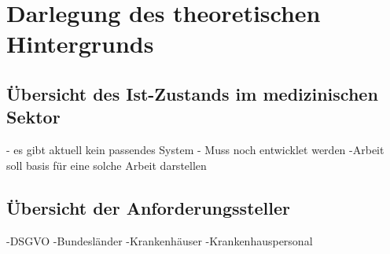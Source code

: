 \chapter{Darlegung des theoretischen Hintergrunds}\label{chapter:hintergrund}

\section{Übersicht des Ist-Zustands im medizinischen Sektor}\label{section:ueda}
- es gibt aktuell kein passendes System 
- Muss noch entwicklet werden
-Arbeit soll basis für eine solche Arbeit darstellen

\section{Übersicht der Anforderungssteller}\label{section:ueda}
-DSGVO
-Bundesländer
-Krankenhäuser
-Krankenhauspersonal

